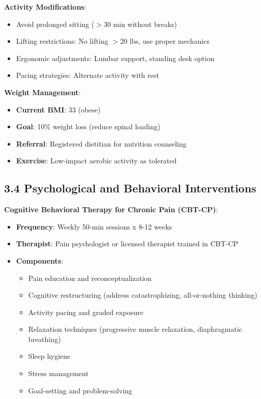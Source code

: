 \documentclass[11pt,letterpaper]{article}
\begin{document}
\textbf{Activity Modifications}:
\begin{itemize}[leftmargin=*]
    \item Avoid prolonged sitting ($>$30 min without breaks)
    \item Lifting restrictions: No lifting $>$20 lbs, use proper mechanics
    \item Ergonomic adjustments: Lumbar support, standing desk option
    \item Pacing strategies: Alternate activity with rest
\end{itemize}

\textbf{Weight Management}:
\begin{itemize}[leftmargin=*]
    \item \textbf{Current BMI}: 33 (obese)
    \item \textbf{Goal}: 10\% weight loss (reduce spinal loading)
    \item \textbf{Referral}: Registered dietitian for nutrition counseling
    \item \textbf{Exercise}: Low-impact aerobic activity as tolerated
\end{itemize}

\subsection*{3.4 Psychological and Behavioral Interventions}

\textbf{Cognitive Behavioral Therapy for Chronic Pain (CBT-CP)}:
\begin{itemize}[leftmargin=*]
    \item \textbf{Frequency}: Weekly 50-min sessions x 8-12 weeks
    \item \textbf{Therapist}: Pain psychologist or licensed therapist trained in CBT-CP
    \item \textbf{Components}:
    \begin{itemize}
        \item Pain education and reconceptualization
        \item Cognitive restructuring (address catastrophizing, all-or-nothing thinking)
        \item Activity pacing and graded exposure
        \item Relaxation techniques (progressive muscle relaxation, diaphragmatic breathing)
        \item Sleep hygiene
        \item Stress management
        \item Goal-setting and problem-solving
    \end{itemize}
\end{itemize}
\end{document}
